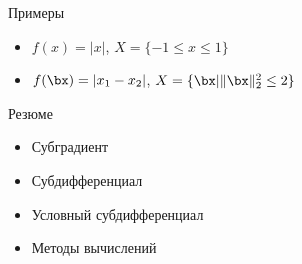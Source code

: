 \documentclass[12pt,russian]{beamer}
\begin{document}
\begin{frame}{Примеры}
\begin{itemize}
\item $f(x) = |x|$, $X = \{-1 \leq x \leq 1 \}$
\item $f(\bx) = |x_1 - x_2|$, $X = \{ \bx | \| \bx \|^2_2 \leq 2 \}$
\end{itemize}
\end{frame}

\begin{frame}{Резюме}
\begin{itemize}
\item Субградиент
\item Субдифференциал
\item Условный субдифференциал
\item Методы вычислений
\end{itemize}
\end{frame}
\end{document}

